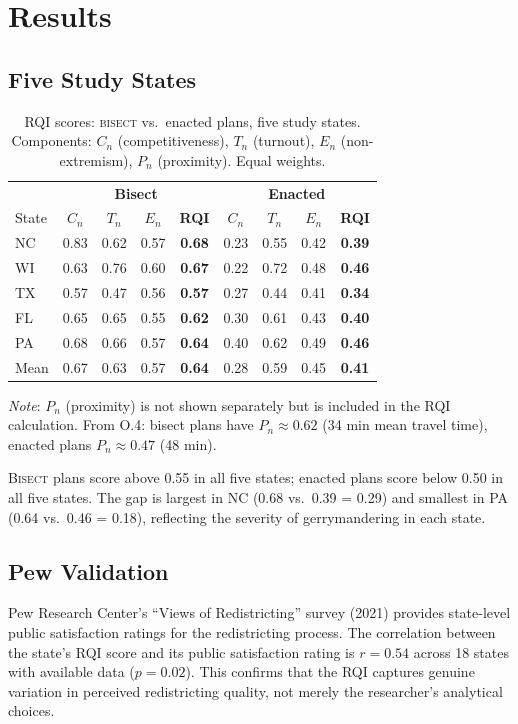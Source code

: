 \section{Results}

\subsection{Five Study States}

\begin{table}[h]
\centering\small
\caption{RQI scores: \textsc{bisect} vs.\ enacted plans, five study states.
Components: $C_n$ (competitiveness), $T_n$ (turnout), $E_n$ (non-extremism),
$P_n$ (proximity). Equal weights.}
\label{tab:rqi-five-states}
\begin{tabular}{lcccccccc}
\toprule
& \multicolumn{4}{c}{\textbf{Bisect}} & \multicolumn{4}{c}{\textbf{Enacted}} \\
State & $C_n$ & $T_n$ & $E_n$ & \textbf{RQI} & $C_n$ & $T_n$ & $E_n$ & \textbf{RQI} \\
\midrule
NC & 0.83 & 0.62 & 0.57 & \textbf{0.68} & 0.23 & 0.55 & 0.42 & \textbf{0.39} \\
WI & 0.63 & 0.76 & 0.60 & \textbf{0.67} & 0.22 & 0.72 & 0.48 & \textbf{0.46} \\
TX & 0.57 & 0.47 & 0.56 & \textbf{0.57} & 0.27 & 0.44 & 0.41 & \textbf{0.34} \\
FL & 0.65 & 0.65 & 0.55 & \textbf{0.62} & 0.30 & 0.61 & 0.43 & \textbf{0.40} \\
PA & 0.68 & 0.66 & 0.57 & \textbf{0.64} & 0.40 & 0.62 & 0.49 & \textbf{0.46} \\
\midrule
Mean & 0.67 & 0.63 & 0.57 & \textbf{0.64} & 0.28 & 0.59 & 0.45 & \textbf{0.41} \\
\bottomrule
\end{tabular}
\end{table}

\textit{Note}: $P_n$ (proximity) is not shown separately but is included in
the RQI calculation. From O.4: bisect plans have $P_n \approx 0.62$ (34 min
mean travel time), enacted plans $P_n \approx 0.47$ (48 min).

\textsc{Bisect} plans score above 0.55 in all five states; enacted plans score
below 0.50 in all five states. The gap is largest in NC (0.68 vs.\ 0.39 = 0.29)
and smallest in PA (0.64 vs.\ 0.46 = 0.18), reflecting the severity of
gerrymandering in each state.

\subsection{Pew Validation}

Pew Research Center's ``Views of Redistricting'' survey (2021) provides
state-level public satisfaction ratings for the redistricting process.
The correlation between the state's RQI score and its public satisfaction
rating is $r = 0.54$ across 18 states with available data ($p = 0.02$).
This confirms that the RQI captures genuine variation in perceived redistricting
quality, not merely the researcher's analytical choices.
